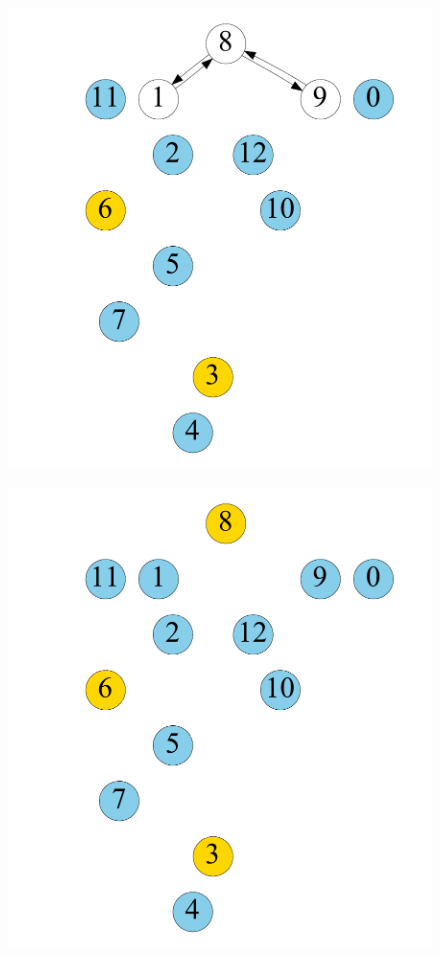 \begin{figure}[t]
\begin{minipage}[b]{0.19\linewidth}
                        {\includegraphics[width=\textwidth]{./alg_fig/scc-g5}}
   		\end{minipage}                  
    \begin{minipage}[b]{0.19\linewidth}
            \centering
                        {\includegraphics[width=\textwidth]{./alg_fig/scc-g7}}

\end{minipage}
\end{figure}
